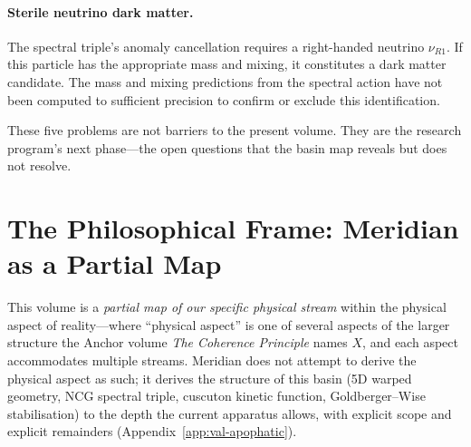 \paragraph{Sterile neutrino dark matter.}
The spectral triple's anomaly cancellation requires a right-handed
neutrino $\nu_{R1}$. If this particle has the appropriate mass and
mixing, it constitutes a dark matter candidate. The mass and mixing
predictions from the spectral action have not been computed to
sufficient precision to confirm or exclude this identification.

These five problems are not barriers to the present volume. They are
the research program's next phase---the open questions that the basin
map reveals but does not resolve.

\section{The Philosophical Frame: Meridian as a Partial Map}
\label{sec:0-anchor}

This volume is a \emph{partial map of our specific physical stream}
within the physical aspect of reality---where ``physical aspect'' is
one of several aspects of the larger structure the Anchor volume
\emph{The Coherence Principle} names $X$, and each aspect
accommodates multiple streams. Meridian does not attempt to derive
the physical aspect as such; it derives the structure of this basin
(5D warped geometry, NCG spectral triple, cuscuton kinetic function,
Goldberger--Wise stabilisation) to the depth the current apparatus
allows, with explicit scope and explicit remainders
(Appendix~\ref{app:val-apophatic}).

